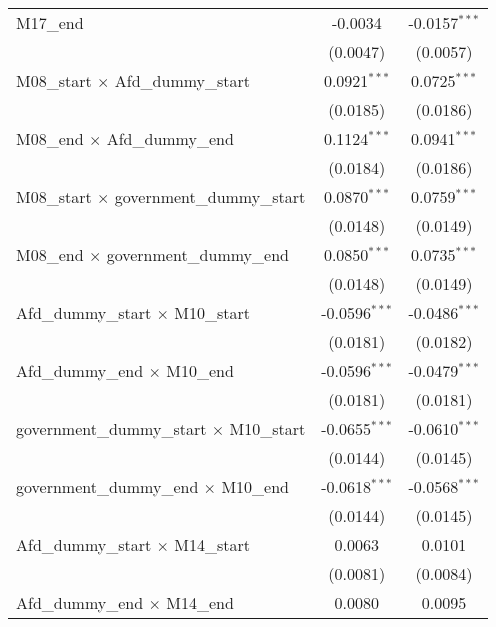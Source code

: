 \documentclass[10pt,a4paper]{article}
\begin{document}
\begin{tabular}{lcc}
   M17\_end                                         & -0.0034         & -0.0157$^{***}$\\   
                                                    & (0.0047)        & (0.0057)\\   
   M08\_start $\times$ Afd\_dummy\_start            & 0.0921$^{***}$  & 0.0725$^{***}$\\   
                                                    & (0.0185)        & (0.0186)\\   
   M08\_end $\times$ Afd\_dummy\_end                & 0.1124$^{***}$  & 0.0941$^{***}$\\   
                                                    & (0.0184)        & (0.0186)\\   
   M08\_start $\times$ government\_dummy\_start     & 0.0870$^{***}$  & 0.0759$^{***}$\\   
                                                    & (0.0148)        & (0.0149)\\   
   M08\_end $\times$ government\_dummy\_end         & 0.0850$^{***}$  & 0.0735$^{***}$\\   
                                                    & (0.0148)        & (0.0149)\\   
   Afd\_dummy\_start $\times$ M10\_start            & -0.0596$^{***}$ & -0.0486$^{***}$\\   
                                                    & (0.0181)        & (0.0182)\\   
   Afd\_dummy\_end $\times$ M10\_end                & -0.0596$^{***}$ & -0.0479$^{***}$\\   
                                                    & (0.0181)        & (0.0181)\\   
   government\_dummy\_start $\times$ M10\_start     & -0.0655$^{***}$ & -0.0610$^{***}$\\   
                                                    & (0.0144)        & (0.0145)\\   
   government\_dummy\_end $\times$ M10\_end         & -0.0618$^{***}$ & -0.0568$^{***}$\\   
                                                    & (0.0144)        & (0.0145)\\   
   Afd\_dummy\_start $\times$ M14\_start            & 0.0063          & 0.0101\\   
                                                    & (0.0081)        & (0.0084)\\   
   Afd\_dummy\_end $\times$ M14\_end                & 0.0080          & 0.0095\\   

\end{tabular}
\end{document}

